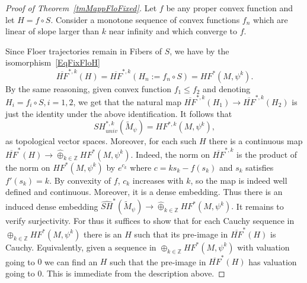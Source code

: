 \documentclass[11pt]{amsart}
\newcommand{\Z}{\mathbb{Z}}
\newtheorem{cy}[tm]{Corollary}
\theoremstyle{definition}
\theoremstyle{remark}
\begin{document}
\begin{proof}[Proof of Theorem~\ref{tmMappFloFixed}]
Let $f$ be any proper convex function and let $H=f\circ S$. Consider a monotone sequence of convex functions $f_n$ which are linear of slope larger than $k$ near infinity and which converge to $f$.

Since Floer trajectories remain in Fibers of $S$, we have by the isomorphism~\eqref{EqFixFloH}
\[
\overline{HF}^{*,k}(H)=\overline{HF}^{*,k}(H_n:=f_n\circ S)=HF^*(M,\psi^k).
\]
By the same reasoning, given convex function $f_1\leq f_2$ and denoting $H_i=f_i\circ S,i=1,2$, we get that the natural map $\overline{HF}^{*,k}(H_1)
\to\overline{HF}^{*,k}(H_2)$ is just the identity under the above identification. It follows that
\[
SH^{*,k}_{univ}(\tilde{M}_\psi)=HF^{*,k}(M,\psi^k),
\]
as topological vector spaces. Moreover, for each such $H$ there is a continuous map $\overline{HF}^*(H)\to\hat{\oplus
}_{k\in\Z }HF^*(M,\psi^k).$ Indeed, the norm on $\overline{HF}^{*,k}$ is the product of the norm on $HF^*(M,\psi^k)$ by $e^{c_k}$ where $c=ks_k-f(s_k)$ and $s_k$ satisfies $f'(s_k)=k$. By convexity of $f$, $c_k$ increases with $k$, so the map is indeed well defined and continuous. Moreover, it is a dense embedding. Thus there is an induced dense embedding $\widehat{SH}^*(\tilde{M}_{\psi})\to\hat{\oplus
}_{k\in\Z }HF^*(M,\psi^k).$ It remains to verify surjectivity. For thus it suffices to show that for each Cauchy sequence in $\oplus_{k\in\Z }HF^*(M,\psi^k)$ there is an $H$ such that its pre-image in $\overline{HF}^*(H)$ is Cauchy. Equivalently, given a sequence in $\oplus_{k\in\Z }HF^*(M,\psi^k)$ with valuation going to $0$ we can find an $H$ such that the pre-image in $\overline{HF}^*(H)$ has valuation going to $0$. This is immediate from the description above.
\end{proof}

\end{document}

